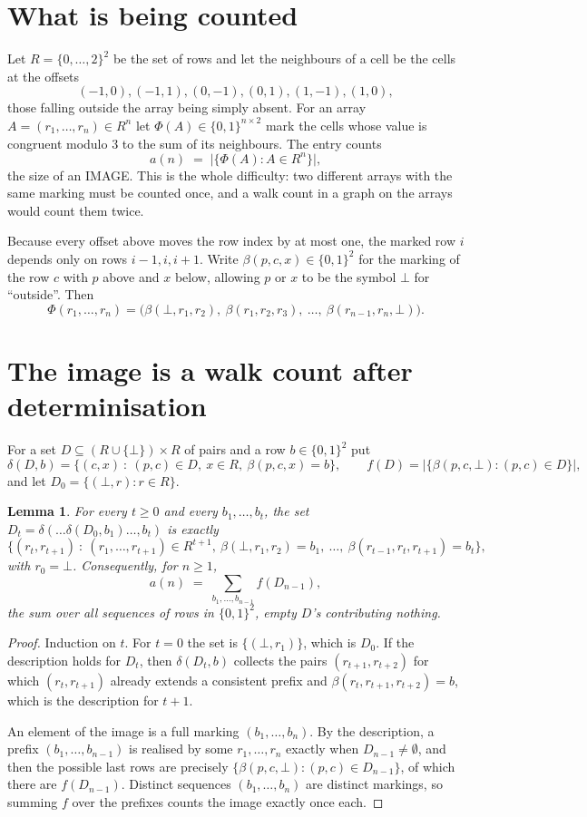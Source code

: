 \documentclass[11pt,a4paper]{article}
\theoremstyle{plain}
\newtheorem{lemma}[theorem]{Lemma}
\theoremstyle{definition}
\begin{document}
\section{What is being counted}

Let $R=\{0,\dots,2\}^{2}$ be the set of rows and let the neighbours of a cell be the
cells at the offsets
\[
(-1,0), (-1,1), (0,-1), (0,1), (1,-1), (1,0),
\]
those falling outside the array being simply absent. For an array
$A=(r_1,\dots,r_n)\in R^n$ let $\Phi(A)\in\{0,1\}^{n\times2}$ mark the cells whose value
is congruent modulo 3 to the sum of its neighbours. The entry counts
\[
a(n)\;=\;\bigl|\{\Phi(A):A\in R^n\}\bigr| ,
\]
the size of an IMAGE. This is the whole difficulty: two different arrays with the same marking
must be counted once, and a walk count in a graph on the arrays would count them twice.

Because every offset above moves the row index by at most one, the marked row $i$ depends only
on rows $i-1,i,i+1$. Write $\beta(p,c,x)\in\{0,1\}^{2}$ for the marking of the row $c$
with $p$ above and $x$ below, allowing $p$ or $x$ to be the symbol $\bot$ for ``outside''.
Then
\[
\Phi(r_1,\dots,r_n)=\bigl(\beta(\bot,r_1,r_2),\ \beta(r_1,r_2,r_3),\ \dots,\
\beta(r_{n-1},r_n,\bot)\bigr).
\]

\section{The image is a walk count after determinisation}

For a set $D\subseteq(R\cup\{\bot\})\times R$ of pairs and a row $b\in\{0,1\}^{2}$ put
\[
\delta(D,b)=\{(c,x)\ :\ (p,c)\in D,\ x\in R,\ \beta(p,c,x)=b\},\qquad
f(D)=\bigl|\{\beta(p,c,\bot):(p,c)\in D\}\bigr| ,
\]
and let $D_0=\{(\bot,r):r\in R\}$.

\begin{lemma}\label{lem:det}
For every $t\ge0$ and every $b_1,\dots,b_t$, the set
$D_t=\delta(\dots\delta(D_0,b_1)\dots,b_t)$ is exactly
\[
\{(r_t,r_{t+1})\ :\ (r_1,\dots,r_{t+1})\in R^{t+1},\ \beta(\bot,r_1,r_2)=b_1,\ \dots,\
\beta(r_{t-1},r_t,r_{t+1})=b_t\} ,
\]
with $r_0=\bot$. Consequently, for $n\ge1$,
\[
a(n)\;=\;\sum_{b_1,\dots,b_{n-1}}f(D_{n-1}),
\]
the sum over all sequences of rows in $\{0,1\}^{2}$, empty $D$'s contributing nothing.
\end{lemma}

\begin{proof}
Induction on $t$. For $t=0$ the set is $\{(\bot,r_1)\}$, which is $D_0$. If the description
holds for $D_t$, then $\delta(D_t,b)$ collects the pairs $(r_{t+1},r_{t+2})$ for which
$(r_t,r_{t+1})$ already extends a consistent prefix and
$\beta(r_t,r_{t+1},r_{t+2})=b$, which is the description for $t+1$.

An element of the image is a full marking $(b_1,\dots,b_n)$. By the description, a prefix
$(b_1,\dots,b_{n-1})$ is realised by some $r_1,\dots,r_n$ exactly when $D_{n-1}\neq
\emptyset$, and then the possible last rows are precisely
$\{\beta(p,c,\bot):(p,c)\in D_{n-1}\}$, of which there are $f(D_{n-1})$. Distinct
sequences $(b_1,\dots,b_n)$ are distinct markings, so summing $f$ over the prefixes counts the
image exactly once each.
\end{proof}
\end{document}
